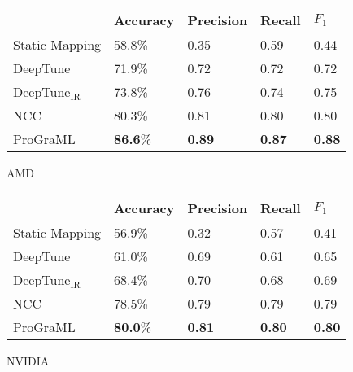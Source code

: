 \centering
\footnotesize
\renewcommand{\arraystretch}{1.6}
\begin{subfigure}{.48\linewidth}
\begin{tabular}{l llll}
  \toprule
   & Accuracy & Precision & Recall & $F_1$\\
  \midrule
  Static Mapping                 & 58.8\% & 0.35 & 0.59 & 0.44\\
  DeepTune~\cite{Cummins2017b}   & 71.9\% & 0.72 & 0.72 & 0.72\\
  DeepTune$_{\text{IR}}$         & 73.8\% & 0.76 & 0.74 & 0.75\\
  NCC~\cite{Ben-nun2018}    & 80.3\% & 0.81 & 0.80 & 0.80\\
  ProGraML                       & \textbf{86.6}\% & \textbf{0.89} & \textbf{0.87} & \textbf{0.88}\\
  \midrule
\end{tabular}
\caption{AMD}
\end{subfigure}
\begin{subfigure}{.48\linewidth}
\begin{tabular}{l llll}
  \toprule
   & Accuracy & Precision & Recall & $F_1$\\
  \midrule
  Static Mapping                 & 56.9\%    & 0.32 & 0.57 & 0.41\\
  DeepTune~\cite{Cummins2017b}   & 61.0\%    & 0.69 & 0.61 & 0.65\\
  DeepTune$_{\text{IR}}$         & 68.4\% & 0.70 & 0.68 & 0.69\\
  NCC~\cite{Ben-nun2018}    & 78.5\%   & 0.79 & 0.79 & 0.79\\
  ProGraML                       & \textbf{80.0}\% & \textbf{0.81} & \textbf{0.80} & \textbf{0.80}\\
  \midrule
\end{tabular}
\caption{NVIDIA}
\end{subfigure}